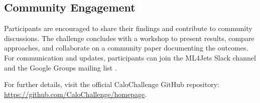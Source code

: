 \subsection{Community Engagement}

Participants are encouraged to share their findings and contribute to community discussions. The challenge concludes with a workshop to present results, compare approaches, and collaborate on a community paper documenting the outcomes. For communication and updates, participants can join the ML4Jets Slack channel and the Google Groups mailing list \cite{calochallenge}.

For further details, visit the official CaloChallenge GitHub repository: \url{https://github.com/CaloChallenge/homepage}.




